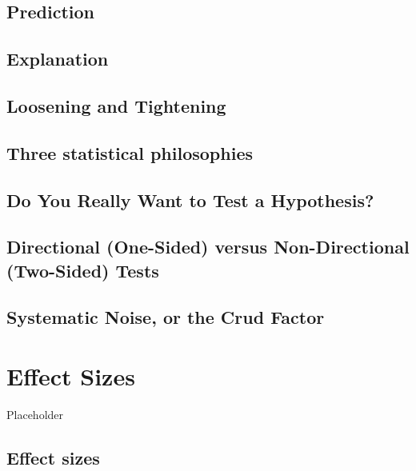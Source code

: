 \documentclass[
  oneside]{krantz}
\begin{document}
\hypertarget{prediction}{%
\subsection{Prediction}\label{prediction}}

\hypertarget{explanation}{%
\subsection{Explanation}\label{explanation}}

\hypertarget{loosening-and-tightening}{%
\subsection{Loosening and Tightening}\label{loosening-and-tightening}}

\hypertarget{three-statistical-philosophies}{%
\subsection{Three statistical
philosophies}\label{three-statistical-philosophies}}

\hypertarget{do-you-really-want-to-test-a-hypothesis}{%
\subsection{Do You Really Want to Test a
Hypothesis?}\label{do-you-really-want-to-test-a-hypothesis}}

\hypertarget{onesided}{%
\subsection{Directional (One-Sided) versus Non-Directional (Two-Sided)
Tests}\label{onesided}}

\hypertarget{crud}{%
\subsection{Systematic Noise, or the Crud Factor}\label{crud}}

\hypertarget{effectsize}{%
\section{Effect Sizes}\label{effectsize}}

Placeholder

\hypertarget{effect-sizes}{%
\subsection{Effect sizes}\label{effect-sizes}}
\end{document}
